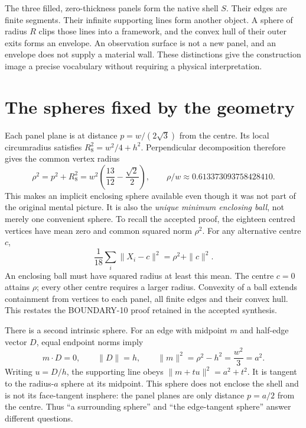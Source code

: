 The three filled, zero-thickness panels form the native shell $S$. Their edges are finite segments. Their infinite supporting lines form another object. A sphere of radius $R$ clips those lines into a framework, and the convex hull of their outer exits forms an envelope. An observation surface is not a new panel, and an envelope does not supply a material wall. These distinctions give the construction image a precise vocabulary without requiring a physical interpretation.

\section{The spheres fixed by the geometry}
Each panel plane is at distance $p=w/(2\sqrt3)$ from the centre. Its local circumradius satisfies $R_8^2=w^2/4+h^2$. Perpendicular decomposition therefore gives the common vertex radius
\begin{equation}\label{eq:rho}
\rho^2=p^2+R_8^2
=w^2\left(\frac{13}{12}-\frac{\sqrt2}{2}\right),
\qquad \rho/w\approx0.613373093758428410 .
\end{equation}
This makes an implicit enclosing sphere available even though it was not part of the original mental picture. It is also the \emph{unique minimum enclosing ball}, not merely one convenient sphere. To recall the accepted proof, the eighteen centred vertices have mean zero and common squared norm $\rho^2$. For any alternative centre $c$,
\begin{equation}\label{eq:minball}
\frac1{18}\sum_i\|X_i-c\|^2=\rho^2+\|c\|^2.
\end{equation}
An enclosing ball must have squared radius at least this mean. The centre $c=0$ attains $\rho$; every other centre requires a larger radius. Convexity of a ball extends containment from vertices to each panel, all finite edges and their convex hull. This restates the BOUNDARY-10 proof retained in the accepted synthesis.~\cite[Sec.~3]{SP}

There is a second intrinsic sphere. For an edge with midpoint $m$ and half-edge vector $D$, equal endpoint norms imply
\begin{equation}\label{eq:midpoint}
m\mathbin{\cdot}D=0,\qquad \|D\|=h,\qquad
\|m\|^2=\rho^2-h^2=\frac{w^2}{3}=a^2.
\end{equation}
Writing $u=D/h$, the supporting line obeys $\|m+tu\|^2=a^2+t^2$. It is tangent to the radius-$a$ sphere at its midpoint. This sphere does not enclose the shell and is not its face-tangent insphere: the panel planes are only distance $p=a/2$ from the centre. Thus ``a surrounding sphere'' and ``the edge-tangent sphere'' answer different questions.~\cite[Sec.~3]{SP}

